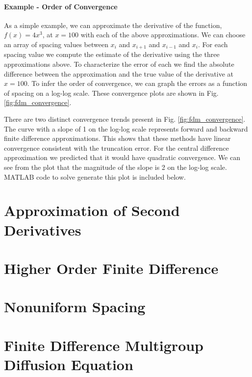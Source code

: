 \paragraph{Example - Order of Convergence}
As a simple example, we can approximate the derivative of the function, $f\left(x\right) = 4x^{3}$, at $x=100$ with
each of the above approximations. We can choose an array of spacing values between $x_{i}$ and $x_{i+1}$ and $x_{i-1}$
and $x_{i}$. For each spacing value we compute the estimate of the derivative using the three approximations above.
To characterize the error of each we find the absolute difference between the approximation and the true value of the
derivative at $x=100$. To infer the order of convergence, we can graph the errors as a function of spacing on a 
log-log scale. These convergence plots are shown in Fig. \ref{fig:fdm_convergence}.
\par 
There are two distinct convergence trends present in Fig. \ref{fig:fdm_convergence}.  The curve with a slope of 1 on
the log-log scale represents forward and backward finite difference approximations. This shows that these methods
have linear convergence consistent with the truncation error. For the central difference approximation we predicted
that it would have quadratic convergence. We can see from the plot that the magnitude of the slope is 2 on the log-log scale.
MATLAB code to solve generate this plot is included below.


\section{Approximation of Second Derivatives}

\section{Higher Order Finite Difference}

\section{Nonuniform Spacing}
\label{subsec:fdm_nonuniform}


\section{Finite Difference Multigroup Diffusion Equation}

